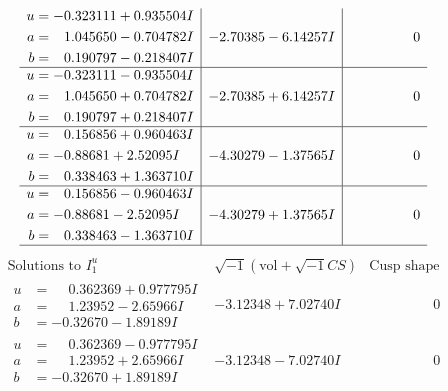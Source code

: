 \documentclass[1p]{elsarticle_modified}
\theoremstyle{definition}
\newcommand{\I}{\sqrt{-1}}
\begin{document}
$$\begin{array}{c|c|c}
\begin{aligned}
u &= -0.323111 + 0.935504 I \\
a &= \phantom{-}1.045650 - 0.704782 I \\
b &= \phantom{-}0.190797 - 0.218407 I\end{aligned}
 & -2.70385 - 6.14257 I & \phantom{-0.000000 } 0 \\ \hline\begin{aligned}
u &= -0.323111 - 0.935504 I \\
a &= \phantom{-}1.045650 + 0.704782 I \\
b &= \phantom{-}0.190797 + 0.218407 I\end{aligned}
 & -2.70385 + 6.14257 I & \phantom{-0.000000 } 0 \\ \hline\begin{aligned}
u &= \phantom{-}0.156856 + 0.960463 I \\
a &= -0.88681 + 2.52095 I \\
b &= \phantom{-}0.338463 + 1.363710 I\end{aligned}
 & -4.30279 - 1.37565 I & \phantom{-0.000000 } 0 \\ \hline\begin{aligned}
u &= \phantom{-}0.156856 - 0.960463 I \\
a &= -0.88681 - 2.52095 I \\
b &= \phantom{-}0.338463 - 1.363710 I\end{aligned}
 & -4.30279 + 1.37565 I & \phantom{-0.000000 } 0\\
 \hline 
 \end{array}$$\newpage$$\begin{array}{c|c|c}  
\text{Solutions to }I^u_{1}& \I (\text{vol} + \sqrt{-1}CS) & \text{Cusp shape}\\
 \hline 
\begin{aligned}
u &= \phantom{-}0.362369 + 0.977795 I \\
a &= \phantom{-}1.23952 - 2.65966 I \\
b &= -0.32670 - 1.89189 I\end{aligned}
 & -3.12348 + 7.02740 I & \phantom{-0.000000 } 0 \\ \hline\begin{aligned}
u &= \phantom{-}0.362369 - 0.977795 I \\
a &= \phantom{-}1.23952 + 2.65966 I \\
b &= -0.32670 + 1.89189 I\end{aligned}
 & -3.12348 - 7.02740 I & \phantom{-0.000000 } 0 \\ \hline\begin{aligned}

\end{aligned}
\end{array}$$
\end{document}
